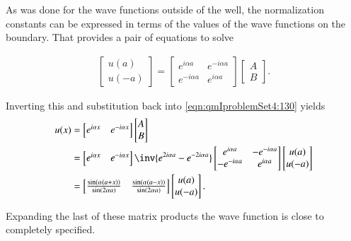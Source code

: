 As was done for the wave functions outside of the well, the normalization constants can be expressed in terms of the values of the wave functions on the boundary.  That provides a pair of equations to solve

\begin{align}\label{eqn:qmIproblemSet4:135}
\begin{bmatrix}
u(a) \\
u(-a)
\end{bmatrix}
=
\begin{bmatrix}
e^{i \alpha a} & e^{-i \alpha a} \\
e^{-i \alpha a} & e^{i \alpha a}
\end{bmatrix}
\begin{bmatrix}
A \\
B
\end{bmatrix}.
\end{align}

Inverting this and substitution back into \ref{eqn:qmIproblemSet4:130} yields
\begin{align*}
u(x) 
&=
\begin{bmatrix}
e^{i\alpha x} & e^{-i\alpha x}
\end{bmatrix}
\begin{bmatrix}
A \\
B
\end{bmatrix} \\
&=
\begin{bmatrix}
e^{i\alpha x} & e^{-i\alpha x}
\end{bmatrix}
\inv{e^{2 i \alpha a} - e^{-2 i \alpha a}}
\begin{bmatrix}
e^{i \alpha a} & -e^{-i \alpha a} \\
-e^{-i \alpha a} & e^{i \alpha a}
\end{bmatrix}
\begin{bmatrix}
u(a) \\
u(-a)
\end{bmatrix} \\
&=
\begin{bmatrix}
\frac{\sin(\alpha (a + x))}{\sin(2 \alpha a)} &
\frac{\sin(\alpha (a - x))}{\sin(2 \alpha a)}
\end{bmatrix}
\begin{bmatrix}
u(a) \\
u(-a)
\end{bmatrix}.
\end{align*}

Expanding the last of these matrix products the wave function is close to completely specified.

